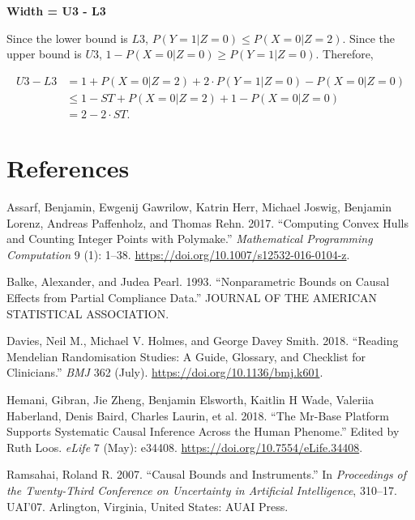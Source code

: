 \documentclass[
]{article}
\theoremstyle{plain}
\begin{document}
\textbf{Width = U3 - L3}

Since the lower bound is \(L3\), \(P(Y = 1 | Z = 0) \le P(X = 0 | Z = 2)\). Since the upper bound is \(U3\), \(1 - P(X = 0 | Z = 0) \ge P(Y = 1 | Z = 0)\). Therefore,

\[\begin{aligned}
U3 - L3 &= 1 + P(X = 0 | Z = 2) + 2\cdot P(Y = 1 | Z = 0) - P(X = 0 | Z = 0) \\
        &\le 1 - ST + P(X = 0 | Z = 2) + 1 - P(X = 0 | Z = 0) \\
        &= 2 - 2\cdot ST.
\end{aligned}\]

\newpage

\hypertarget{references}{%
\section*{References}\label{references}}

\hypertarget{refs}{}
\leavevmode\hypertarget{ref-assarf_computing_2017}{}%
Assarf, Benjamin, Ewgenij Gawrilow, Katrin Herr, Michael Joswig, Benjamin Lorenz, Andreas Paffenholz, and Thomas Rehn. 2017. ``Computing Convex Hulls and Counting Integer Points with Polymake.'' \emph{Mathematical Programming Computation} 9 (1): 1--38. \url{https://doi.org/10.1007/s12532-016-0104-z}.

\leavevmode\hypertarget{ref-balke_nonparametric_1993}{}%
Balke, Alexander, and Judea Pearl. 1993. ``Nonparametric Bounds on Causal Effects from Partial Compliance Data.'' JOURNAL OF THE AMERICAN STATISTICAL ASSOCIATION.

\leavevmode\hypertarget{ref-davies_reading_2018}{}%
Davies, Neil M., Michael V. Holmes, and George Davey Smith. 2018. ``Reading Mendelian Randomisation Studies: A Guide, Glossary, and Checklist for Clinicians.'' \emph{BMJ} 362 (July). \url{https://doi.org/10.1136/bmj.k601}.

\leavevmode\hypertarget{ref-mrbase}{}%
Hemani, Gibran, Jie Zheng, Benjamin Elsworth, Kaitlin H Wade, Valeriia Haberland, Denis Baird, Charles Laurin, et al. 2018. ``The Mr-Base Platform Supports Systematic Causal Inference Across the Human Phenome.'' Edited by Ruth Loos. \emph{eLife} 7 (May): e34408. \url{https://doi.org/10.7554/eLife.34408}.

\leavevmode\hypertarget{ref-ramsahai_causal_2007}{}%
Ramsahai, Roland R. 2007. ``Causal Bounds and Instruments.'' In \emph{Proceedings of the Twenty-Third Conference on Uncertainty in Artificial Intelligence}, 310--17. UAI'07. Arlington, Virginia, United States: AUAI Press.
\end{document}
